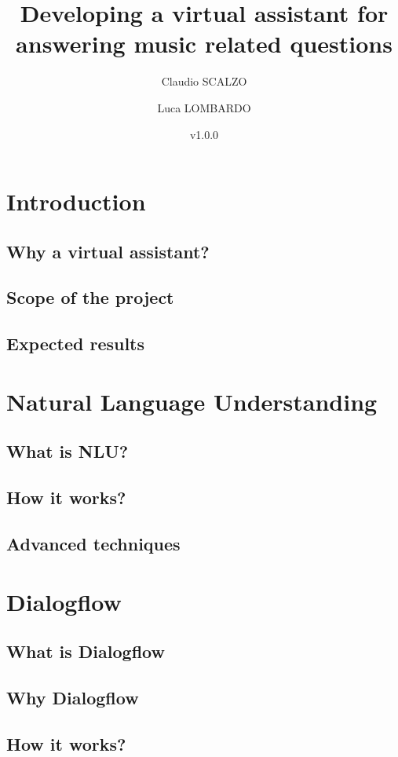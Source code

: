 \documentclass[a4paper,12pt]{report}
\title{Developing a virtual assistant for answering music related questions}
\author{Claudio SCALZO \and Luca LOMBARDO}
\date{v1.0.0}
\begin{document}
\maketitle
\tableofcontents

\chapter{Introduction}
\section{Why a virtual assistant?}
\section{Scope of the project}
\section{Expected results}

\chapter{Natural Language Understanding}
\section{What is NLU?}
\section{How it works?}
\section{Advanced techniques}

\chapter{Dialogflow}
\section{What is Dialogflow}
\section{Why Dialogflow}
\section{How it works?}
\end{document}
